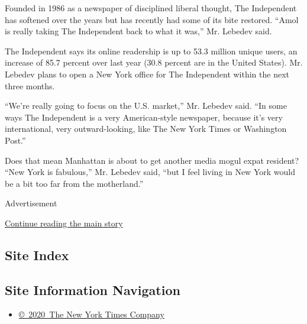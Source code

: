 Founded in 1986 as a newspaper of disciplined liberal thought, The
Independent has softened over the years but has recently had some of its
bite restored. ``Amol is really taking The Independent back to what it
was,'' Mr. Lebedev said.

The Independent says its online readership is up to 53.3 million unique
users, an increase of 85.7 percent over last year (30.8 percent are in
the United States). Mr. Lebedev plans to open a New York office for The
Independent within the next three months.

``We're really going to focus on the U.S. market,'' Mr. Lebedev said.
``In some ways The Independent is a very American-style newspaper,
because it's very international, very outward-looking, like The New York
Times or Washington Post.''

Does that mean Manhattan is about to get another media mogul expat
resident? ``New York is fabulous,'' Mr. Lebedev said, ``but I feel
living in New York would be a bit too far from the motherland.''

Advertisement

\protect\hyperlink{after-bottom}{Continue reading the main story}

\hypertarget{site-index}{%
\subsection{Site Index}\label{site-index}}

\hypertarget{site-information-navigation}{%
\subsection{Site Information
Navigation}\label{site-information-navigation}}

\begin{itemize}
\tightlist
\item
  \href{https://help.nytimes.com/hc/en-us/articles/115014792127-Copyright-notice}{©~2020~The
  New York Times Company}
\end{itemize}

